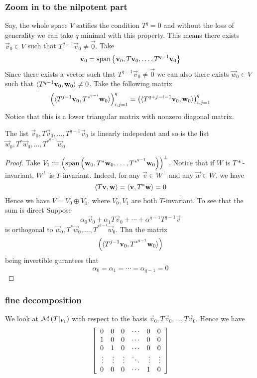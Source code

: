 \subsubsection*{Zoom in to the nilpotent part}
	Say, the whole space $V$ satifies the condition $T^q = 0$ and without the loss of generality we can take $q$ minimal with this property. This means there exists $\vec v_0 \in V$ such that $T^{q - 1} \vec v_0 \neq \vec 0$. Take 
	\[ \mathbf v_0 = \text{span} \left\{ \mathbf v_0 , T\mathbf v_0, \ldots, T^{q-1} \mathbf v_0 \right\}\]
	Since there exists a vector such that $T^{q - 1} \vec v_0 \neq \vec 0$ we can also there exists $\vec w_0 \in V$ such that $\langle T^{q-1}\mathbf v_0, \mathbf w_0\rangle \neq 0$. Take the following matrix
	\[ \left( \langle T^{j-1}\mathbf v_0 , T^{*^{q-i}} \mathbf w_0 \rangle\right)_{i,j = 1}^q = \left( \langle T^{q + j - i - 1} \mathbf v_0, \mathbf w_0 \rangle\right)_{i,j = 1}^q\]
	Notice that this is a lower triangular matrix with nonzero diagonal matrix.
\begin{corollary}
	The list $\vec v_0 , T\vec v_0, \ldots, T^{q-1} \vec v_0$ is linearly indepedent and so is the list $\vec w_0 , T^*\vec w_0, \ldots, T^{*^{q-1}} \vec w_0 $
\end{corollary}
\begin{proof}
	Take $V_1 := \left( \text{span} \left( \mathbf w_0 , T^*\mathbf w_0, \ldots, T^{*^{q-1}} \mathbf w_0 \right) \right)^{\perp}$. Notice that if $W$ is $T*$-invariant, $W^\perp$ is $T$-invariant. Indeed, for any $\vec v \in W^\perp$ and any $\vec w \in W$, we have \[\langle T \mathbf v, \mathbf w \rangle =\langle  \mathbf v, T^* \mathbf w \rangle = 0\]
	Hence we have $V = V_0 \oplus V_1$, where $V_0, V_1$ are both $T$-invariant. To see that the sum is direct 
	Suppose \[\alpha_0 \vec v_0 + \alpha_1 T\vec v_0 + \cdots + \alpha^{q-1}T^{q-1}\vec v\]
	is orthogonal to $\vec w_0 , T^*\vec w_0, \ldots, T^{*^{q-1}} \vec w_0 $. Thn the matrix 
	\[ \left( \langle T^{j-1} \mathbf v_0, T^{*^{q-1}} \mathbf w_0 \rangle\right)\] 
	being invertible gurantees that
	\[ \alpha_0 = \alpha_1 = \cdots = \alpha_{q-1} = 0\]
\end{proof}
\subsubsection*{fine decomposition}
We look at $\mathcal M\left( T\vert_{V_1}\right)$ with respect to the basis $\vec v_0 , T\vec v_0, \ldots, T\vec v_0$. Hence we have 
\[ \left[ \begin{array}{rrrrrrrrrrrrrrrrr} 
	0 & 0 & 0 & \cdots & 0 & 0\\ 
	1 & 0 & 0 & \cdots & 0 & 0\\
	0 & 1 & 0 & \cdots & 0 & 0\\
	\vdots & \vdots & \vdots & \ddots & \vdots & \vdots\\

	0 & 0 & 0 & \cdots & 1 & 0\end{array} \right]\]
